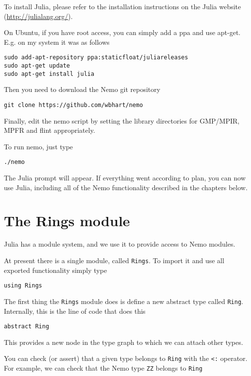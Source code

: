 \documentclass[a4paper,10pt]{article}
\newcommand{\code}{\lstinline}
\begin{document}
{To install Julia, please refer to the installation instructions on the Julia website
(\url{http://julialang.org/}).

On Ubuntu, if you have root access, you can simply add a ppa and use apt-get. E.g. on
my system it was as follows

\begin{verbatim}
sudo add-apt-repository ppa:staticfloat/juliareleases
sudo apt-get update
sudo apt-get install julia
\end{verbatim}

Then you need to download the Nemo git repository

\begin{verbatim}
git clone https://github.com/wbhart/nemo
\end{verbatim}

Finally, edit the nemo script by setting the library directories for GMP/MPIR, MPFR
and flint appropriately.

To run nemo, just type

\begin{verbatim}
./nemo
\end{verbatim}

The Julia prompt will appear. If everything went according to plan, you can now use 
Julia, including all of the Nemo functionality described in the chapters below.

\section{The Rings module}

Julia has a module system, and we use it to provide access to Nemo modules.

At present there is a single module, called \code{Rings}. To import it and use all
exported functionality simply type

\begin{lstlisting}
using Rings
\end{lstlisting}

The first thing the \code{Rings} module does is define a new abstract type called
\code{Ring}. Internally, this is the line of code that does this

\begin{lstlisting}
abstract Ring
\end{lstlisting}

This provides a new node in the type graph to which we can attach other types. 

You can check (or assert) that a given type belongs to \code{Ring} with the
\code{<:} operator. For example, we can check that the Nemo type \code{ZZ} belongs
to \code{Ring}

}
\end{document}
